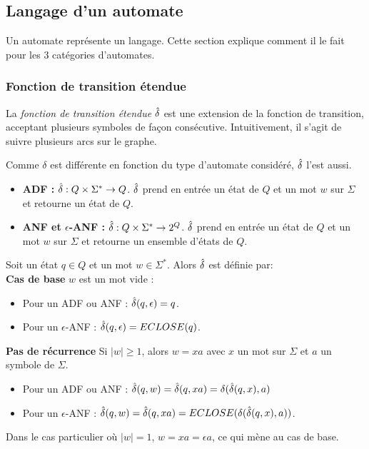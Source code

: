 
\subsection{Langage d'un automate}\label{adf:lang}
Un automate représente un langage. Cette section explique comment il le fait pour les 3 catégories d'automates.

\subsubsection*{Fonction de transition étendue}

La \emph{fonction de transition étendue} $\hat{\delta}$ est une extension de la fonction de transition, acceptant plusieurs symboles de façon consécutive. Intuitivement, il s'agit de suivre plusieurs arcs sur le graphe.

Comme $\delta$ est différente en fonction du type d'automate considéré, $\hat{\delta}$ l'est aussi.

\begin{itemize}
  \item \textbf{ADF :} $\hat{\delta} : Q \times \Sigma^* \rightarrow Q$. $\hat{\delta}$ prend en entrée un état de $Q$ et un mot $w$ sur $\Sigma$ et retourne un état de $Q$.
  \item \textbf{ANF et $\epsilon$-ANF :} $\hat{\delta} : Q \times \Sigma^* \rightarrow 2^Q$. $\hat{\delta}$ prend en entrée un état de $Q$ et un mot $w$ sur $\Sigma$ et retourne un ensemble d'états de $Q$.
\end{itemize}

Soit un état $q \in Q$ et un mot $w \in \Sigma^*$. Alors $\hat{\delta}$ est définie par:\\
\textbf{Cas de base} $w$ est un mot vide :
  \begin{itemize}
    \item Pour un ADF ou ANF : $\hat{\delta}(q, \epsilon) = q$.
    \item Pour un $\epsilon$-ANF : $\hat{\delta}(q, \epsilon) = ECLOSE(q)$.
  \end{itemize}
\textbf{Pas de récurrence} Si $|w|\ge 1$, alors $w=xa$ avec $x$ un mot sur $\Sigma$ et $a$ un symbole de $\Sigma$.
\begin{itemize}
  \item Pour un ADF ou ANF : $\hat{\delta}(q,w) = \hat{\delta}(q,xa)= \delta(\hat{\delta}(q,x),a)$
  \item Pour un $\epsilon$-ANF : $\hat{\delta}(q,w) = \hat{\delta}(q,xa)= ECLOSE(\delta(\hat{\delta}(q,x),a))$.
\end{itemize}
Dans le cas particulier où $|w|=1$, $w=xa=\epsilon a$, ce qui mène au cas de base.

